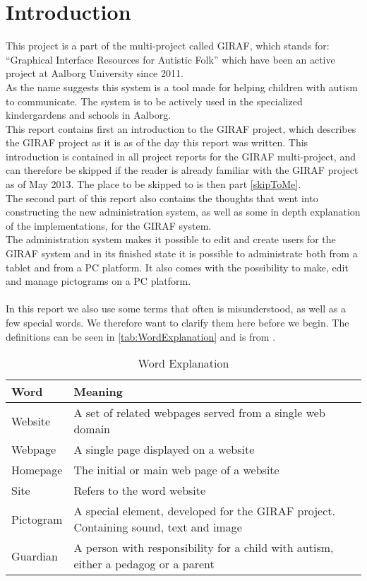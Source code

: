 \chapter*{Introduction}
\label{chap:introduction}
\vspace{-2.0em}
This project is a part of the multi-project called GIRAF, which stands for: ``Graphical Interface Resources for Autistic Folk'' which have been an active project at Aalborg University since 2011.\\
As the name suggests this system is a tool made for helping children with autism to communicate. The system is to be actively used in the specialized kindergardens and schools in Aalborg.\\
This report contains first an introduction to the GIRAF project, which describes the GIRAF project as it is as of the day this report was written. This introduction is contained in all project reports for the GIRAF multi-project, and can therefore be skipped if the reader is already familiar with the GIRAF project as of May 2013. The place to be skipped to is then part \vref{skipToMe}.\\
The second part of this report also contains the thoughts that went into constructing the new administration system, as well as some in depth explanation of the implementations, for the GIRAF system.\\
The administration system makes it possible to edit and create users for the GIRAF system and in its finished state it is possible to administrate both from a tablet and from a PC platform. It also comes with the possibility to make, edit and manage pictograms on a PC platform.\\
\\
In this report we also use some terms that often is misunderstood, as well as a few special words. We therefore want to clarify them here before we begin. The definitions can be seen in \autoref{tab:WordExplanation} and is from \citep{wikipedia}.


\begin{table}[h]
        \centering
                \begin{tabularx}{\textwidth}{|l|X|}
                        \hline
                        Word & Meaning\\\hline\hline
                        Website & A set of related webpages served from a single web domain\\\hline
                        Webpage & A single page displayed on a website\\\hline
                        Homepage & The initial or main web page of a website\\\hline
                        Site & Refers to the word website\\\hline
                        Pictogram & A special element, developed for the GIRAF project. Containing sound, text and image\\\hline
                        Guardian & A person with responsibility for a child with autism, either a pedagog or a parent\\\hline
                \end{tabularx}
        \caption{Word Explanation}
        \label{tab:WordExplanation}
\end{table}
